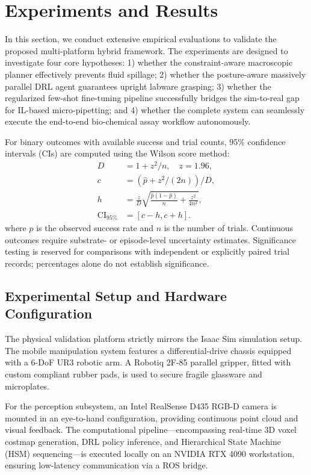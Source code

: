 \section{Experiments and Results}
\label{sec:experiments}

In this section, we conduct extensive empirical evaluations to validate the proposed multi-platform hybrid framework. The experiments are designed to investigate four core hypotheses:
1) whether the constraint-aware macroscopic planner effectively prevents fluid spillage;
2) whether the posture-aware massively parallel DRL agent guarantees upright labware grasping;
3) whether the regularized few-shot fine-tuning pipeline successfully bridges the sim-to-real gap for IL-based micro-pipetting; and
4) whether the complete system can seamlessly execute the end-to-end bio-chemical assay workflow autonomously.

For binary outcomes with available success and trial counts, 95\% confidence intervals (CIs) are computed using the Wilson score method:
\begin{equation}
    \begin{aligned}
    D &= 1+z^2/n,\quad z=1.96,\\
    c &= (\hat p+z^2/(2n))/D,\\
    h &= \frac{z}{D}\sqrt{\frac{\hat p(1-\hat p)}{n}+\frac{z^2}{4n^2}},\\
    \text{CI}_{95\%} &= [c-h,c+h].
    \end{aligned}
\end{equation}
where $\hat{p}$ is the observed success rate and $n$ is the number of trials.
Continuous outcomes require substrate- or episode-level uncertainty estimates. Significance testing is reserved for comparisons with independent or explicitly paired trial records; percentages alone do not establish significance.

\subsection{Experimental Setup and Hardware Configuration}
\label{subsec:exp_setup}

The physical validation platform strictly mirrors the Isaac Sim simulation setup. The mobile manipulation system features a differential-drive chassis equipped with a 6-DoF UR3 robotic arm. A Robotiq 2F-85 parallel gripper, fitted with custom compliant rubber pads, is used to secure fragile glassware and microplates.

For the perception subsystem, an Intel RealSense D435 RGB-D camera is mounted in an eye-to-hand configuration, providing continuous point cloud and visual feedback. The computational pipeline---encompassing real-time 3D voxel costmap generation, DRL policy inference, and Hierarchical State Machine (HSM) sequencing---is executed locally on an NVIDIA RTX 4090 workstation, ensuring low-latency communication via a ROS bridge.

